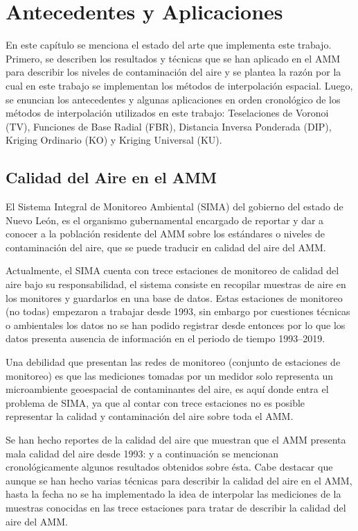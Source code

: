 \chapter{Antecedentes y Aplicaciones}

En este capítulo se menciona el estado del arte que implementa este trabajo. Primero, se describen los resultados y técnicas que se han aplicado en el AMM para describir los niveles de contaminación del aire y se plantea la razón por la cual en este trabajo se implementan los métodos de interpolación espacial. Luego, se enuncian los antecedentes y algunas aplicaciones en orden cronológico de los métodos de interpolación utilizados en este trabajo: Teselaciones de Voronoi (TV), Funciones de Base Radial (FBR), Distancia Inversa Ponderada (DIP), Kriging Ordinario (KO) y Kriging Universal (KU).

\section{Calidad del Aire en el AMM}

El Sistema Integral de Monitoreo Ambiental (SIMA) del gobierno del estado de Nuevo León, es el organismo gubernamental encargado de reportar y dar a conocer a la población residente del AMM sobre los estándares o niveles de contaminación del aire, que se puede traducir en calidad del aire del AMM.

Actualmente, el SIMA cuenta con trece estaciones de monitoreo de calidad del aire bajo su responsabilidad, el sistema consiste en recopilar muestras de aire en los monitores y guardarlos en una base de datos. Estas estaciones de monitoreo (no todas) empezaron a trabajar desde 1993, sin embargo por cuestiones técnicas o ambientales los datos no se han podido registrar desde entonces por lo que los datos presenta ausencia de información en el periodo de tiempo 1993--2019. 

Una debilidad que presentan las redes de monitoreo (conjunto de estaciones de monitoreo) es que las mediciones tomadas por un medidor solo representa un microambiente geoespacial de contaminantes del aire, es aquí donde entra el problema de SIMA, ya que al contar con trece estaciones no es posible representar la calidad y contaminación del aire sobre toda el AMM.

Se han hecho reportes de la calidad del aire que muestran que el AMM presenta mala calidad del aire desde 1993: y a continuación se mencionan cronológicamente algunos resultados obtenidos sobre ésta. Cabe destacar que aunque se han hecho varias técnicas para describir la calidad del aire en el AMM, hasta la fecha no se ha implementado la idea de interpolar las mediciones de la muestras conocidas en las trece estaciones para tratar de describir la calidad del aire del AMM.

